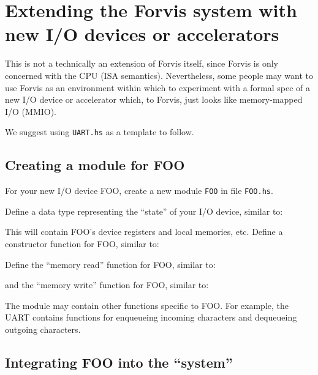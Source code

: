 \documentclass[11pt]{article}
\begin{document}

\newpage

\section{Extending the Forvis system with new I/O devices or accelerators}

\label{sec_accelerators}

This is not a technically an extension of Forvis itself, since Forvis
is only concerned with the CPU (ISA semantics).  Nevertheless, some
people may want to use Forvis as an environment within which to
experiment with a formal spec of a new I/O device or accelerator
which, to Forvis, just looks like memory-mapped I/O (MMIO).

We suggest using \verb|UART.hs| as a template to follow.


\subsection{Creating a module for FOO}

For your new I/O device FOO, create a new module \verb|FOO| in file
\verb|FOO.hs|.

Define a data type representing the ``state'' of your I/O device, similar to:



This will contain FOO's device registers and local memories, etc.
Define a constructor function for FOO, similar to:



Define the ``memory read'' function for FOO, similar to:



and the ``memory write'' function for FOO, similar to:



The module may contain other functions specific to FOO.  For example,
the UART contains functions for enqueueing incoming characters and
dequeueing outgoing characters.


\subsection{Integrating FOO into the ``system''}
\end{document}
